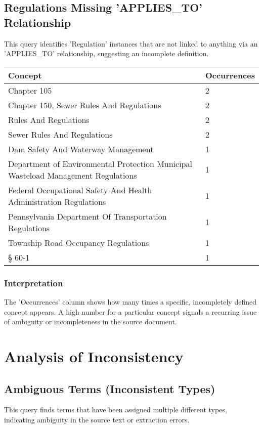 \subsection*{Regulations Missing 'APPLIES\_TO' Relationship}
This query identifies 'Regulation' instances that are not linked to anything via an 'APPLIES\_TO' relationship, suggesting an incomplete definition.

\begin{longtable}{p{} p{}}
\toprule
\textbf{Concept} & \textbf{Occurrences} \\
\midrule
\endfirsthead
\endhead
Chapter 105 & 2 \\
Chapter 150, Sewer Rules And Regulations & 2 \\
Rules And Regulations & 2 \\
Sewer Rules And Regulations & 2 \\
Dam Safety And Waterway Management & 1 \\
Department of Environmental Protection Municipal Wasteload Management Regulations & 1 \\
Federal Occupational Safety And Health Administration Regulations & 1 \\
Pennsylvania Department Of Transportation Regulations & 1 \\
Township Road Occupancy Regulations & 1 \\
§ 60-1 & 1 \\
\bottomrule
\end{longtable}
\subsubsection*{Interpretation}
The 'Occurrences' column shows how many times a specific, incompletely defined concept appears. A high number for a particular concept signals a recurring issue of ambiguity or incompleteness in the source document.
\clearpage
\section{Analysis of Inconsistency}
\subsection*{Ambiguous Terms (Inconsistent Types)}
This query finds terms that have been assigned multiple different types, indicating ambiguity in the source text or extraction errors.

